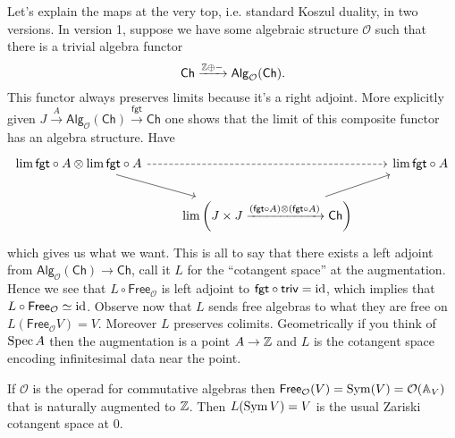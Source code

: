 \documentclass{amsart}
\begin{document}
Let's explain the maps at the very top, i.e. standard Koszul duality, in two versions.
In version 1, suppose we have
some algebraic structure $\mathcal{O}$ such that there is a trivial algebra functor
\begin{equation*}
    \mathsf{Ch} \xrightarrow{\mathbb{Z}\oplus-} \mathsf{Alg}_{\mathcal{O}}(\mathsf{Ch}).
\end{equation*}
This functor always preserves limits because it's a right adjoint. More explicitly
given $J\xrightarrow{A}\mathsf{Alg}_\mathcal{O}(\mathsf{Ch})\xrightarrow{\mathsf{fgt}}\mathsf{Ch}$ one
shows that the limit of this composite functor has an algebra structure. Have
\begin{equation*}
    \begin{tikzcd}
        \lim \mathsf{fgt}\circ A\otimes \lim \mathsf{fgt}\circ A \ar[rr, dashed] \ar[dr] && \lim \mathsf{fgt}\circ A\\
        & \lim \left(J\times J\xrightarrow{(\mathsf{fgt}\circ A)\otimes(\mathsf{fgt}\circ A)}\mathsf{Ch}\right)\ar[ur]
    \end{tikzcd}
\end{equation*}
which gives us what we want. This is all to say that there exists a left adjoint
from $\mathsf{Alg}_\mathcal{O}(\mathsf{Ch})\to\mathsf{Ch}$, call it $L$ for the
``cotangent space'' at the augmentation.
Hence we see that $L\circ\mathsf{Free}_{\mathcal{O}}$ is left adjoint to $\mathsf{fgt}\circ\mathsf{triv}=\operatorname{id}$,
which implies that $L\circ\mathsf{Free}_\mathcal{O}\simeq \operatorname{id}$. Observe now that $L$
sends free algebras to what they are free on $L(\mathsf{Free}_\mathcal{O}V)= V$.
Moreover $L$ preserves colimits. Geometrically if you think of $\operatorname{Spec} A$ then
the augmentation is a point $A\to\mathbb{Z}$ and $L$ is the cotangent space encoding
infinitesimal data near the point.

If $\mathcal{O}$ is the operad for commutative algebras then $\mathsf{Free}_{\mathcal{O}}(V)=\operatorname{Sym}(V)=\mathcal{O}(\mathbb{A}_V)$
that is naturally augmented to $\mathbb{Z}$. Then $L(\operatorname{Sym} V)=V$ is the usual Zariski cotangent space at 0.
\end{document}
